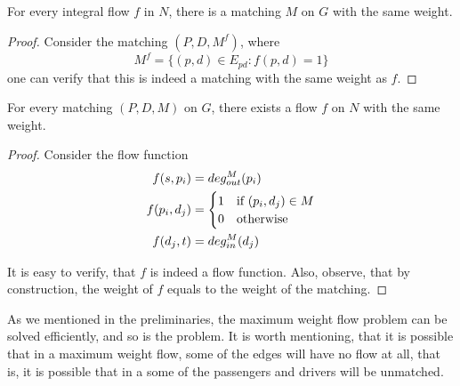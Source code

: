\begin{observation}
For every integral flow $f$ in $N$, there is a matching $M$ on $G$ with the same weight. 
\end{observation}

\begin{proof}
Consider the matching $(P, D, M^f)$, where 
$$ M^f = \{(p, d) \in E_{pd} : f(p, d) = 1\} $$
one can verify that this is indeed a matching with the same weight as $f$.
\end{proof}

\begin{observation}
For every matching $(P, D, M)$ on $G$, there exists a flow $f$ on $N$ with the same weight. 
\end{observation}

\begin{proof}
Consider the flow function
\begin{align*}
f(s, p_i)		& = deg^M_{out}(p_i)		 				\\
f(p_i, d_j)		& = 
				\begin{cases}
				1 & \text{if } (p_i, d_j) \in M		\\
				0 & \text{otherwise}
				\end{cases}						\\
f(d_j, t) 	& = deg^M_{in}(d_j) 
\end{align*}

It is easy to verify, that $f$ is indeed a flow function.
Also, observe, that by construction,
the weight of $f$ equals to the weight of the matching.
\end{proof}

As we mentioned in the preliminaries, 
the maximum weight flow problem can be solved efficiently, 
and so is the \FIXEDCARPOOL{} problem.
It is worth mentioning, that it is possible that in a maximum weight flow, 
some of the edges will have no flow at all, 
that is, it is possible that in a \FIXEDCARPOOL{}
some of the passengers and drivers will be unmatched.  